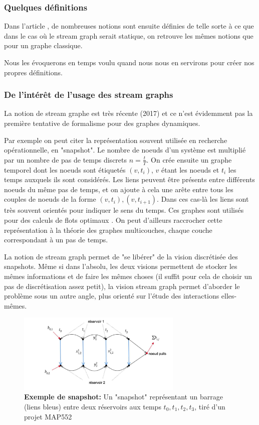\documentclass[11pt,a4paper]{article}
\theoremstyle{definition}
\theoremstyle{remark}
\theoremstyle{remark}
\begin{document}
\subsubsection{Quelques définitions}

Dans l'article \cite{stream}, de nombreuses notions sont ensuite définies de telle sorte à ce que dans le cas où le stream graph serait statique, on retrouve les mêmes notions que pour un graphe classique.

Nous les évoquerons en temps voulu quand nous nous en servirons pour créer nos propres définitions.

\subsubsection{De l'intérêt de l'usage des stream graphs}
La notion de stream graphe est très récente (2017)\cite{stream} et ce n'est évidemment pas la première tentative de formalisme pour des graphes dynamiques.

Par exemple on peut citer la représentation souvent utilisée en recherche opérationnelle, en "snapshot". Le nombre de noeuds d'un système est multiplié par un nombre de pas de temps discrets $n=\frac{t}{T}$. On crée ensuite un graphe temporel dont les noeuds sont étiquetés $(v,t_i)$, $v$ étant les noeuds et $t_i$ les temps auxquels ils sont considérés. Les liens peuvent être présents entre différents noeuds du même pas de temps, et on ajoute à cela une arête entre tous les couples de noeuds de la forme $(v,t_i),(v,t_{i+1})$. 
Dans ces cas-là les liens sont très souvent orientés pour indiquer le sens du temps. Ces graphes sont utilisés pour des calculs de flots optimaux \cite{map}. On peut d'ailleurs raccrocher cette représentation à la théorie des graphes multicouches, chaque couche correspondant à un pas de temps.

La notion de stream graph permet de "se libérer" de la vision discrétisée des snapshots. Même si dans l'absolu, les deux visions permettent de stocker les mêmes informations et de faire les mêmes choses (il suffit pour cela de choisir un pas de discrétisation assez petit), la vision stream graph permet d'aborder le problème sous un autre angle, plus orienté sur l'étude des interactions elles-mêmes.

\begin{figure}
\centering
	\includegraphics[width=0.7\textwidth]{snapshot.JPG}
	\caption{\textbf{Exemple de snapshot:} Un "snapshot" représentant un barrage (liens bleus) entre deux réservoirs aux temps $t_0,t_1,t_2,t_3$, tiré d'un projet MAP552}
\end{figure}
\end{document}
